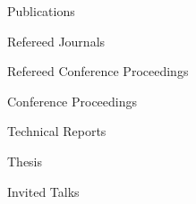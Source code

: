 
\begin{rSection}{Publications}
  \begin{rSubsection}{Refereed Journals}{}{}{}
    \printbibliography[keyword=journal,heading=none]
  \end{rSubsection}
  \begin{rSubsection}{Refereed Conference Proceedings}{}{}{}
    \protect \printbibliography[keyword=proceeding,heading=none]
  \end{rSubsection}
  \begin{rSubsection}{Conference Proceedings}{}{}{}
    \printbibliography[keyword=nonRefereedProceeding,heading=none]
  \end{rSubsection}
  \begin{rSubsection}{Technical Reports}{}{}{}
    \printbibliography[keyword=techReport,heading=none]
  \end{rSubsection}
  \begin{rSubsection}{Thesis}{}{}{}
    \printbibliography[keyword=thesis,heading=none]
  \end{rSubsection}
  \begin{rSubsection}{Invited Talks}{}{}{}
    \printbibliography[keyword=invitedTalk,heading=none]
  \end{rSubsection}
\end{rSection}
